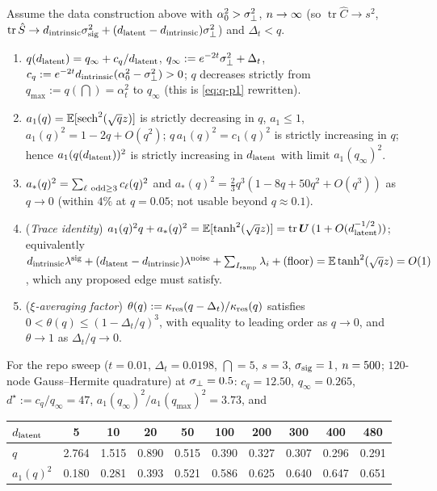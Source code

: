 \begin{lemma}\label{lem:coeffs-buf}
Assume the data construction above with $\alpha_0^2>\sigma_{\perp}^2$, $n\to\infty$ (so $\operatorname{tr}\hat C\to s^2$, $\operatorname{tr}\hat S\to d_{\mathrm{intrinsic}}\sigma_{\mathrm{sig}}^2+(d_{\mathrm{latent}}-d_{\mathrm{intrinsic}})\sigma_{\perp}^2$) and $\Delta_t<q$.
\begin{enumerate}
\item[(i)] $q(d_{\mathrm{latent}})=q_\infty+c_q/d_{\mathrm{latent}}$, $q_\infty:=e^{-2t}\sigma_{\perp}^2+\Delta_t$, $c_q:=e^{-2t}d_{\mathrm{intrinsic}}(\alpha_0^2-\sigma_{\perp}^2)>0$; $q$ decreases strictly from $q_{\max}:=q(\dint)=\alpha_t^2$ to $q_\infty$ (this is \eqref{eq:q-p1} rewritten).
\item[(ii)] $a_1(q)=\mathbb{E}[\operatorname{sech}^2(\sqrt qz)]$ is strictly decreasing in $q$, $a_1\le1$, $a_1(q)^2=1-2q+O(q^2)$; $q\,a_1(q)^2=c_1(q)^2$ is strictly increasing in $q$; hence $a_1(q(d_{\mathrm{latent}}))^2$ is strictly increasing in $d_{\mathrm{latent}}$ with limit $a_1(q_\infty)^2$.
\item[(iii)] $a_*(q)^2=\sum_{\ell\ {\rm odd}\ge3}c_\ell(q)^2$ and $a_*(q)^2=\tfrac23q^3(1-8q+50q^2+O(q^3))$ as $q\to0$ (within $4\%$ at $q=0.05$; not usable beyond $q\approx0.1$).
\item[(iv)] (\emph{Trace identity}) $a_1(q)^2q+a_*(q)^2=\mathbb{E}[\tanh^2(\sqrt qz)]=\operatorname{tr}\bm{U}\,(1+O(d_{\mathrm{latent}}^{-1/2}))$; equivalently $d_{\mathrm{intrinsic}}\lambda^{\rm sig}+(d_{\mathrm{latent}}-d_{\mathrm{intrinsic}})\lambda^{\rm noise}+\sum_{I_{\rm samp}}\lambda_i+(\text{floor})=\mathbb{E}\tanh^2(\sqrt qz)=O(1)$, which any proposed edge must satisfy.
\item[(v)] (\emph{$\xi$-averaging factor}) $\theta(q):=\kappa_{\rm res}(q-\Delta_t)/\kappa_{\rm res}(q)$ satisfies $0<\theta(q)\le(1-\Delta_t/q)^3$, with equality to leading order as $q\to0$, and $\theta\to1$ as $\Delta_t/q\to0$.
\end{enumerate}
For the repo sweep ($t=0.01$, $\Delta_t=0.0198$, $\dint=5$, $s=3$, $\sigma_{\mathrm{sig}}=1$, $n=500$; $120$-node Gauss--Hermite quadrature) at $\sigma_{\perp}=0.5$: $c_q=12.50$, $q_\infty=0.265$, $d^\star:=c_q/q_\infty=47$, $a_1(q_\infty)^2/a_1(q_{\max})^2=3.73$, and
\begin{center}\small
\begin{tabular}{lccccccccc}
$d_{\mathrm{latent}}$ & 5 & 10 & 20 & 50 & 100 & 200 & 300 & 400 & 480\\ \hline
$q$ & 2.764 & 1.515 & 0.890 & 0.515 & 0.390 & 0.327 & 0.307 & 0.296 & 0.291\\
$a_1(q)^2$ & 0.180 & 0.281 & 0.393 & 0.521 & 0.586 & 0.625 & 0.640 & 0.647 & 0.651\\

\end{tabular}
\end{center}
\end{lemma}
